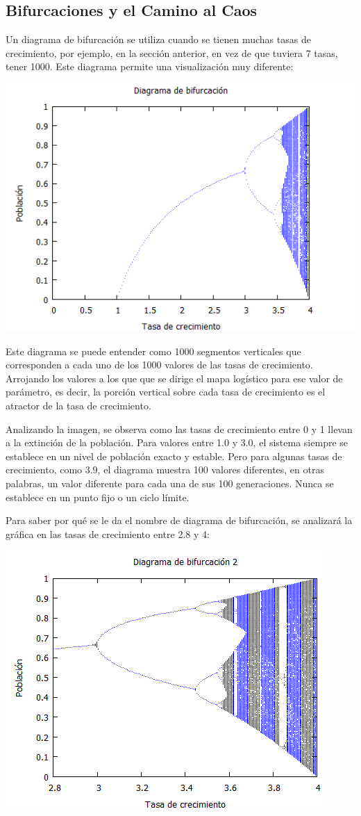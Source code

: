 \documentclass{article}
\begin{document}
\subsection{Bifurcaciones y el Camino al Caos}

Un diagrama de bifurcación se utiliza cuando se tienen muchas tasas de crecimiento, por ejemplo, en la sección anterior, en vez de que tuviera 7 tasas, tener 1000. Este diagrama permite una visualización muy diferente:

\begin{center}
\includegraphics[width=.6\textwidth]{Imagen2.PNG}
\end{center}

Este diagrama se puede entender como 1000 segmentos verticales que corresponden a cada uno de los 1000 valores de las tasas de crecimiento. Arrojando los valores a los que que se dirige el mapa logístico para ese valor de parámetro, es decir, la porción vertical sobre cada tasa de crecimiento es el atractor de la tasa de crecimiento.

Analizando la imagen, se observa como las tasas de crecimiento entre 0 y 1 llevan a la extinción de la población. Para valores entre 1.0 y 3.0, el sistema siempre se establece en un nivel de población exacto y estable. Pero para algunas tasas de crecimiento, como 3.9, el diagrama muestra 100 valores diferentes, en otras palabras, un valor diferente para cada una de sus 100 generaciones. Nunca se establece en un punto fijo o un ciclo límite.

Para saber por qué se le da el nombre de diagrama de bifurcación, se analizará la gráfica en las tasas de crecimiento entre 2.8 y 4:

\begin{center}
\includegraphics[width=.7\textwidth]{Imagen3.PNG}
\end{center}
\end{document}
